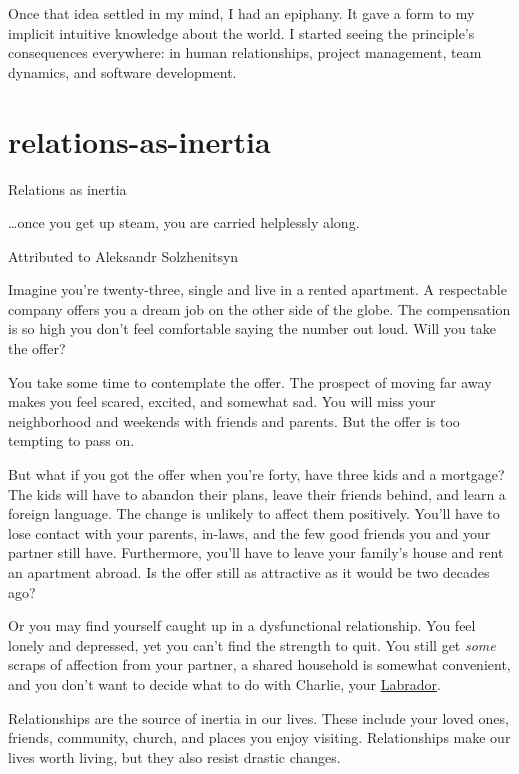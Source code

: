 \documentclass{article}
\begin{document}
Once that idea settled in my mind, I had an epiphany.
It gave a form to my implicit intuitive knowledge about the world.
I started seeing the principle's consequences everywhere: in human relationships, project management, team dynamics, and software development.

\section{relations-as-inertia}{Relations as inertia}

\epigraph{
    \ldots once you get up steam, you are carried helplessly along.
}{Attributed to Aleksandr Solzhenitsyn}

Imagine you're twenty-three, single and live in a rented apartment.
A respectable company offers you a dream job on the other side of the globe.
The compensation is so high you don't feel comfortable saying the number out loud.
Will you take the offer?

You take some time to contemplate the offer.
The prospect of moving far away makes you feel scared, excited, and somewhat sad.
You will miss your neighborhood and weekends with friends and parents.
But the offer is too tempting to pass on.

But what if you got the offer when you're forty, have three kids and a mortgage?
The kids will have to abandon their plans, leave their friends behind, and learn a foreign language.
The change is unlikely to affect them positively.
You'll have to lose contact with your parents, in-laws, and the few good friends you and your partner still have.
Furthermore, you'll have to leave your family's house and rent an apartment abroad.
Is the offer still as attractive as it would be two decades ago?

Or you may find yourself caught up in a dysfunctional relationship.
You feel lonely and depressed, yet you can't find the strength to quit.
You still get \emph{some} scraps of affection from your partner, a shared household is somewhat convenient, and you don't want to decide what to do with Charlie, your \href{https://en.wikipedia.org/wiki/Labrador_Retriever}{Labrador}.

Relationships are the source of inertia in our lives.
These include your loved ones, friends, community, church, and places you enjoy visiting.
Relationships make our lives worth living, but they also resist drastic changes.
\end{document}
